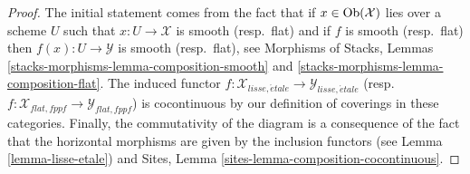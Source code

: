 \begin{proof}
The initial statement comes from the fact that if $x \in \mathop{\rm Ob}\nolimits(\mathcal{X})$
lies over a scheme $U$ such that $x : U \to \mathcal{X}$ is smooth
(resp.\ flat) and if $f$ is smooth (resp.\ flat) then
$f(x) : U \to \mathcal{Y}$ is smooth (resp.\ flat), see
Morphisms of Stacks, Lemmas \ref{stacks-morphisms-lemma-composition-smooth} and
\ref{stacks-morphisms-lemma-composition-flat}. The induced functor
$f : \mathcal{X}_{lisse,\acute{e}tale} \to \mathcal{Y}_{lisse,\acute{e}tale}$
(resp.\ $f : \mathcal{X}_{flat,fppf} \to \mathcal{Y}_{flat,fppf}$) is
cocontinuous by our definition of coverings in these categories. Finally,
the commutativity of the diagram is a consequence of the fact that
the horizontal morphisms are given by the inclusion functors (see
Lemma \ref{lemma-lisse-etale}) and
Sites, Lemma \ref{sites-lemma-composition-cocontinuous}.


\end{proof}
